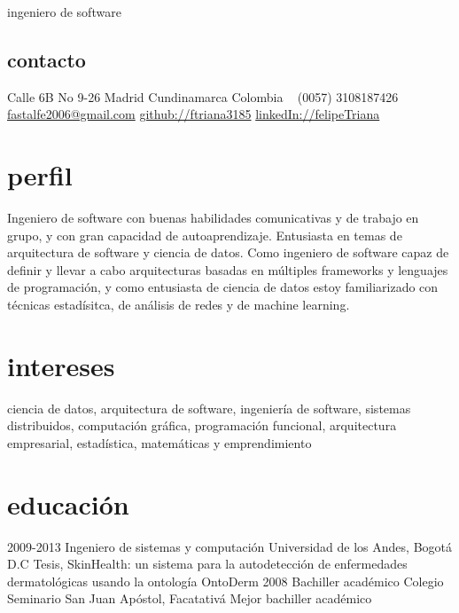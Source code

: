 \documentclass[]{friggeri-cv}
\begin{document}
       {ingeniero de software}


\begin{aside}
  \section{contacto}
    Calle 6B No 9-26
    Madrid Cundinamarca
    Colombia
    ~
    (0057) 3108187426
    ~
    \href{mailto:fastalfe2006@gmail.com}{fastalfe2006@gmail.com}
    \href{https://github.com/ftriana3185}{github://ftriana3185}
    \href{http://co.linkedin.com/pub/felipe-triana-casta%C3%B1eda/55/bb9/4a}{linkedIn://felipeTriana}
\end{aside}

\section{perfil}

Ingeniero de software con buenas habilidades comunicativas y de trabajo en grupo, y con gran capacidad de autoaprendizaje. Entusiasta en temas de arquitectura de software y ciencia de datos. Como ingeniero de software capaz de definir y llevar a cabo arquitecturas basadas en múltiples frameworks y lenguajes de programación, y como entusiasta de ciencia de datos estoy familiarizado con técnicas estadísitca, de análisis de redes y de machine learning.   

\section{intereses}

ciencia de datos, arquitectura de software, ingeniería de software, sistemas distribuidos, computación gráfica, programación funcional, arquitectura empresarial, estadística, matemáticas y emprendimiento 

\section{educación}

\begin{entrylist}
  \entry
    {2009-2013}
    {Ingeniero de sistemas y computación}
    {Universidad de los Andes, Bogotá D.C}
    {Tesis, SkinHealth: un sistema para la autodetección de enfermedades dermatológicas usando la ontología OntoDerm}
  \entry
    {2008}
    {Bachiller académico}
    {Colegio Seminario San Juan Apóstol, Facatativá}
    {Mejor bachiller académico}
\end{entrylist}
\end{document}
